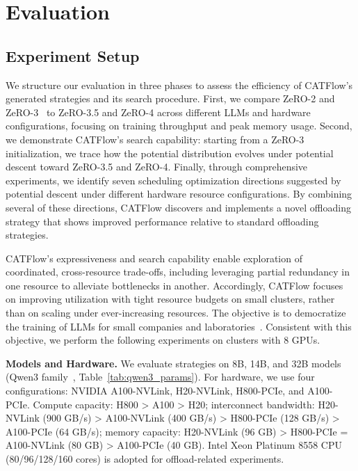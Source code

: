 \documentclass[letterpaper,twocolumn,10pt]{article}
\newcommand{\name}{CATFlow}
\begin{document}
\section{Evaluation}
\label{sec:exp}

\subsection{Experiment Setup}
\label{sec:exp_setting}

We structure our evaluation in three phases to assess the efficiency of \name{}'s generated strategies and its search procedure. First, we compare ZeRO-2 and ZeRO-3~\cite{rajbhandari2020zero} to ZeRO-3.5 and ZeRO-4 across different LLMs and hardware configurations, focusing on training throughput and peak memory usage. Second, we demonstrate \name{}'s search capability: starting from a ZeRO-3 initialization, we trace how the potential distribution evolves under potential descent toward ZeRO-3.5 and ZeRO-4. Finally, through comprehensive experiments, we identify seven scheduling optimization directions suggested by potential descent under different hardware resource configurations. By combining several of these directions, \name{} discovers and implements a novel offloading strategy that shows improved performance relative to standard offloading strategies. 

\name{}'s expressiveness and search capability enable exploration of coordinated, cross-resource trade-offs, including leveraging partial redundancy in one resource to alleviate bottlenecks in another. Accordingly, \name{} focuses on improving utilization with tight resource budgets on small clusters, rather than on scaling under ever-increasing resources. The objective is to democratize the training of LLMs for small companies and laboratories~\cite{sun2025mepipe}. Consistent with this objective, we perform the following experiments on clusters with 8 GPUs.

\textbf{Models and Hardware.} We evaluate strategies on 8B, 14B, and 32B models (Qwen3 family~\cite{yang2025qwen3}, Table~\ref{tab:qwen3_params}). For hardware, we use four configurations: NVIDIA A100-NVLink, H20-NVLink, H800-PCIe, and A100-PCIe. Compute capacity: H800 > A100 > H20; interconnect bandwidth: H20-NVLink (900 GB/s) > A100-NVLink (400 GB/s) > H800-PCIe (128 GB/s) > A100-PCIe (64 GB/s); memory capacity: H20-NVLink (96 GB) > H800-PCIe = A100-NVLink (80 GB) > A100-PCIe (40 GB). Intel Xeon Platinum 8558 CPU (80/96/128/160 cores) is adopted for offload-related experiments.
\end{document}
